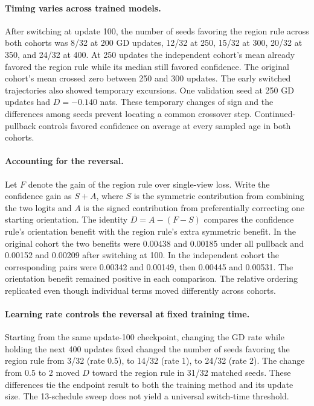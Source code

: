 \paragraph{Timing varies across trained models.}
After switching at update 100, the number of seeds favoring the region rule across both cohorts was 8/32 at 200 GD updates, 12/32 at 250, 15/32 at 300, 20/32 at 350, and 24/32 at 400. At 250 updates the independent cohort's mean already favored the region rule while its median still favored confidence. The original cohort's mean crossed zero between 250 and 300 updates. The early switched trajectories also showed temporary excursions. One validation seed at 250 GD updates had \(D=-0.140\) nats. These temporary changes of sign and the differences among seeds prevent locating a common crossover step. Continued-pullback controls favored confidence on average at every sampled age in both cohorts.

\paragraph{Accounting for the reversal.}
Let \(F\) denote the gain of the region rule over single-view loss. Write the confidence gain as \(S+A\), where \(S\) is the symmetric contribution from combining the two logits and \(A\) is the signed contribution from preferentially correcting one starting orientation. The identity \(D=A-(F-S)\) compares the confidence rule's orientation benefit with the region rule's extra symmetric benefit. In the original cohort the two benefits were 0.00438 and 0.00185 under all pullback and 0.00152 and 0.00209 after switching at 100. In the independent cohort the corresponding pairs were 0.00342 and 0.00149, then 0.00445 and 0.00531. The orientation benefit remained positive in each comparison. The relative ordering replicated even though individual terms moved differently across cohorts.

\paragraph{Learning rate controls the reversal at fixed training time.}
Starting from the same update-100 checkpoint, changing the GD rate while holding the next 400 updates fixed changed the number of seeds favoring the region rule from 3/32 (rate 0.5), to 14/32 (rate 1), to 24/32 (rate 2). The change from 0.5 to 2 moved \(D\) toward the region rule in 31/32 matched seeds. These differences tie the endpoint result to both the training method and its update size. The 13-schedule sweep does not yield a universal switch-time threshold.
